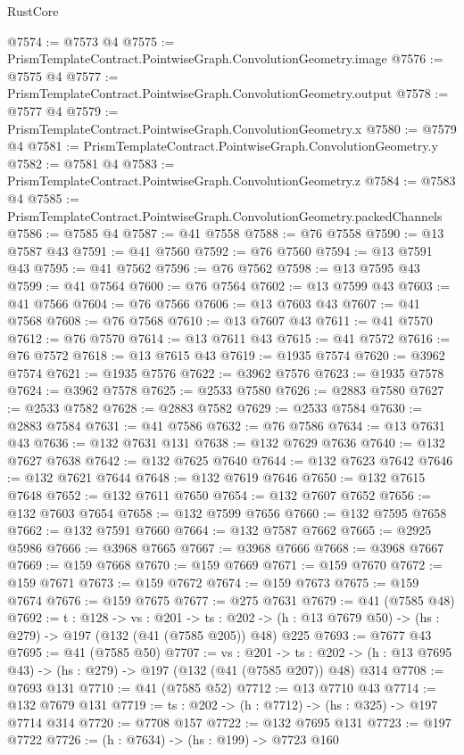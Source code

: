 \begin{lexlean}{RustCore}
\begin{coremodule}
@7574 := @7573 @4
@7575 := PrismTemplateContract.PointwiseGraph.ConvolutionGeometry.image
@7576 := @7575 @4
@7577 := PrismTemplateContract.PointwiseGraph.ConvolutionGeometry.output
@7578 := @7577 @4
@7579 := PrismTemplateContract.PointwiseGraph.ConvolutionGeometry.x
@7580 := @7579 @4
@7581 := PrismTemplateContract.PointwiseGraph.ConvolutionGeometry.y
@7582 := @7581 @4
@7583 := PrismTemplateContract.PointwiseGraph.ConvolutionGeometry.z
@7584 := @7583 @4
@7585 := PrismTemplateContract.PointwiseGraph.ConvolutionGeometry.packedChannels
@7586 := @7585 @4
@7587 := @41 @7558
@7588 := @76 @7558
@7590 := @13 @7587 @43
@7591 := @41 @7560
@7592 := @76 @7560
@7594 := @13 @7591 @43
@7595 := @41 @7562
@7596 := @76 @7562
@7598 := @13 @7595 @43
@7599 := @41 @7564
@7600 := @76 @7564
@7602 := @13 @7599 @43
@7603 := @41 @7566
@7604 := @76 @7566
@7606 := @13 @7603 @43
@7607 := @41 @7568
@7608 := @76 @7568
@7610 := @13 @7607 @43
@7611 := @41 @7570
@7612 := @76 @7570
@7614 := @13 @7611 @43
@7615 := @41 @7572
@7616 := @76 @7572
@7618 := @13 @7615 @43
@7619 := @1935 @7574
@7620 := @3962 @7574
@7621 := @1935 @7576
@7622 := @3962 @7576
@7623 := @1935 @7578
@7624 := @3962 @7578
@7625 := @2533 @7580
@7626 := @2883 @7580
@7627 := @2533 @7582
@7628 := @2883 @7582
@7629 := @2533 @7584
@7630 := @2883 @7584
@7631 := @41 @7586
@7632 := @76 @7586
@7634 := @13 @7631 @43
@7636 := @132 @7631 @131
@7638 := @132 @7629 @7636
@7640 := @132 @7627 @7638
@7642 := @132 @7625 @7640
@7644 := @132 @7623 @7642
@7646 := @132 @7621 @7644
@7648 := @132 @7619 @7646
@7650 := @132 @7615 @7648
@7652 := @132 @7611 @7650
@7654 := @132 @7607 @7652
@7656 := @132 @7603 @7654
@7658 := @132 @7599 @7656
@7660 := @132 @7595 @7658
@7662 := @132 @7591 @7660
@7664 := @132 @7587 @7662
@7665 := @2925 @5986
@7666 := @3968 @7665
@7667 := @3968 @7666
@7668 := @3968 @7667
@7669 := @159 @7668
@7670 := @159 @7669
@7671 := @159 @7670
@7672 := @159 @7671
@7673 := @159 @7672
@7674 := @159 @7673
@7675 := @159 @7674
@7676 := @159 @7675
@7677 := @275 @7631
@7679 := @41 (@7585 @48)
@7692 := {t : @128} ->
  {vs : @201} ->
  {ts : @202} -> (h : @13 @7679 @50) -> (hs : @279) -> @197 (@132 (@41 (@7585 @205)) @48) @225
@7693 := @7677 @43
@7695 := @41 (@7585 @50)
@7707 := {vs : @201} ->
  {ts : @202} -> (h : @13 @7695 @43) -> (hs : @279) -> @197 (@132 (@41 (@7585 @207)) @48) @314
@7708 := @7693 @131
@7710 := @41 (@7585 @52)
@7712 := @13 @7710 @43
@7714 := @132 @7679 @131
@7719 := {ts : @202} -> (h : @7712) -> (hs : @325) -> @197 @7714 @314
@7720 := @7708 @157
@7722 := @132 @7695 @131
@7723 := @197 @7722
@7726 := (h : @7634) -> (hs : @199) -> @7723 @160

\end{coremodule}
\end{lexlean}
